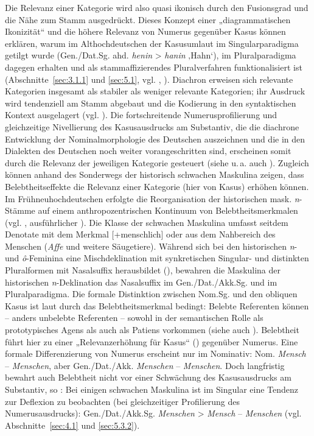 Die Relevanz einer Kategorie wird also quasi ikonisch durch den Fusionsgrad und die Nähe zum Stamm ausgedrückt. Dieses Konzept einer „diagrammatischen Ikonizität“ \citep{Bybee1985a} und die höhere Relevanz von Numerus gegenüber Kasus können erklären, warum im Althochdeutschen der Kasusumlaut im Singularparadigma getilgt wurde (Gen./Dat.Sg. ahd. \textit{henin} > \textit{hanin} ‚Hahn‘), im Pluralparadigma dagegen erhalten und als stammaffizierendes Pluralverfahren funktionalisiert ist (Abschnitte~\ref{sec:3.1.1} und \ref{sec:5.1}, vgl. \citealt[2561]{Bybee1994}, \citealt[617]{DammelEtAl2010}). Diachron erweisen sich relevante Kategorien insgesamt als stabiler als weniger relevante Kategorien; ihr Ausdruck wird tendenziell am Stamm abgebaut und die Kodierung in den syntaktischen Kontext ausgelagert (vgl. \citealt[2561]{Bybee1994}). Die fortschreitende Numerusprofilierung und gleichzeitige Nivellierung des Kasusausdrucks am Substantiv, die die diachrone Entwicklung der Nominalmorphologie des Deutschen auszeichnen und die in den Dialekten des Deutschen noch weiter vorangeschritten sind, erscheinen somit durch die Relevanz der jeweiligen Kategorie gesteuert (siehe u.\,a. auch \citealt{Nübling2005}). Zugleich können \citet{DammelGillmann2014} anhand des Sonderwegs der historisch schwachen Maskulina zeigen, dass Belebtheitseffekte die Relevanz einer Kategorie (hier von Kasus) erhöhen können. Im Frühneuhochdeutschen erfolgte die Reorganisation der historischen mask. \textit{n}{}-Stämme auf einem anthropozentrischen Kontinuum von Belebtheitsmerkmalen (vgl. \citealt{Köpcke2000a}, ausführlicher ). Die Klasse der schwachen Maskulina umfasst seitdem Denotate mit dem Merkmal [+menschlich] oder aus dem Nahbereich des Menschen (\textit{Affe} und weitere Säugetiere). Während sich bei den historischen \textit{n}{}- und \textit{ô}{}-Feminina eine Mischdeklination mit synkretischen Singular- und distinkten Pluralformen mit Nasalsuffix herausbildet (), bewahren die Maskulina der historischen \textit{n}{}-Deklination das Nasalsuffix im Gen./Dat./Akk.Sg. und im Pluralparadigma. Die formale Distinktion zwischen Nom.Sg. und den obliquen Kasus ist laut \citet[209--210]{DammelGillmann2014} durch das Belebtheitsmerkmal bedingt: Belebte Referenten können -- anders unbelebte Referenten -- sowohl in der semantischen Rolle als prototypisches Agens als auch als Patiens vorkommen (siehe auch \citealt[117--118]{Köpcke2000a}). Belebtheit führt hier zu einer „Relevanzerhöhung für Kasus“ (\citealt[211]{DammelGillmann2014}) gegenüber Numerus. Eine formale Differenzierung von Numerus erscheint nur im Nominativ: Nom. \textit{Mensch} -- \textit{Menschen}, aber Gen./Dat./Akk. \textit{Menschen} -- \textit{Menschen}. Doch langfristig bewahrt auch Belebtheit nicht vor einer Schwächung des Kasusausdrucks am Substantiv, so \citet[212]{DammelGillmann2014}: Bei einigen schwachen Maskulina ist im Singular eine Tendenz zur Deflexion zu beobachten (bei gleichzeitiger Profilierung des Numerusausdrucks): Gen./Dat./Akk.Sg. \textit{Menschen} > \textit{Mensch} -- \textit{Menschen} (vgl. Abschnitte~\ref{sec:4.1} und \ref{sec:5.3.2}).

